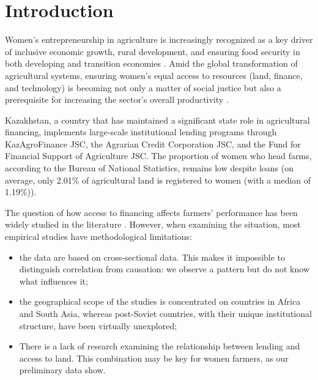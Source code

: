 ﻿\documentclass[pdflatex,sn-mathphys-ay]{sn-jnl}
\begin{document}


\maketitle

\section{Introduction}\label{sec:introduction}

Women's entrepreneurship in agriculture is increasingly recognized as a key driver of inclusive economic growth, rural development, and ensuring food security in both developing and transition economies \citep{ref78}. Amid the global transformation of agricultural systems, ensuring women's equal access to resources (land, finance, and technology) is becoming not only a matter of social justice but also a prerequisite for increasing the sector's overall productivity \citep{ref62,ref26}.

Kazakhstan, a country that has maintained a significant state role in agricultural financing, implements large-scale institutional lending programs through KazAgroFinance JSC, the Agrarian Credit Corporation JSC, and the Fund for Financial Support of Agriculture JSC. The proportion of women who head farms, according to the Bureau of National Statistics, remains low despite loans (on average, only 2.01\% of agricultural land is registered to women (with a median of 1.19\%)).

The question of how access to financing affects farmers' performance has been widely studied in the literature \citep{ref94,ref99}. However, when examining the situation, most empirical studies have methodological limitations:

\begin{itemize}
\item the data are based on cross-sectional data. This makes it impossible to distinguish correlation from causation: we observe a pattern but do not know what influences it;
\item the geographical scope of the studies is concentrated on countries in Africa and South Asia, whereas post-Soviet countries, with their unique institutional structure, have been virtually unexplored;
\item There is a lack of research examining the relationship between lending and access to land. This combination may be key for women farmers, as our preliminary data show.
\end{itemize}
\end{document}
